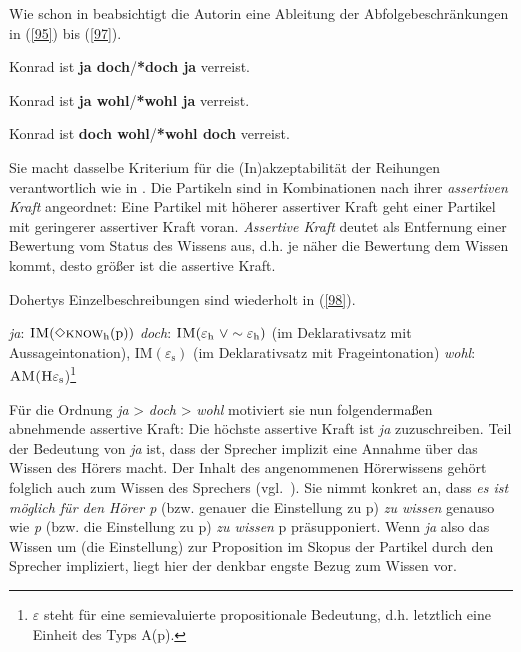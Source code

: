 Wie schon in \citet{Doherty1985} beabsichtigt die Autorin eine Ableitung der Abfolgebeschränkungen in (\ref{95}) bis (\ref{97}).

\begin{exe}
	\ex\label{95} 
	Konrad ist \textbf{ja doch}/\textbf{*doch ja} verreist.
\end{exe}
\begin{exe}
	\ex\label{96} 
	Konrad ist \textbf{ja wohl}/\textbf{*wohl ja} verreist.
\end{exe}
\begin{exe}
	\ex\label{97} 
	Konrad ist \textbf{doch wohl}/\textbf{*wohl doch }verreist.
			\hfill\hbox{\citet[114]{Doherty1987}}
\end{exe}
Sie macht dasselbe Kriterium für die (In)akzeptabilität der Reihungen verantwortlich wie in \citet{Doherty1985}. Die Partikeln sind in Kombinationen nach ihrer \textit{assertiven Kraft} angeordnet: Eine Partikel mit höherer assertiver Kraft geht einer Partikel mit geringerer assertiver Kraft voran. \textit{Assertive Kraft} deutet \citet{Doherty1987} als Entfernung einer Bewertung vom Status des Wissens aus, d.h. je näher die Bewertung dem Wissen kommt, desto größer ist die assertive Kraft.

Dohertys Einzelbeschreibungen sind wiederholt in (\ref{98}).
\begin{exe}
	\ex\label{98} 
		\begin{xlist}	
			\ex\label{98a} \textit{ja}: $\textrm{\textsc{IM}}(\Diamond \textrm{\textsc{know}}_{\textrm{h}}(\textrm{p}))$
			\ex\label{98b} \textit{doch}: $\textrm{\textsc{IM}}(\varepsilon_{\textrm{h}} \ \lor \sim\varepsilon_{\textrm{h}})$ (im Deklarativsatz mit Aussageintonation), \textsc{IM}$(\varepsilon_{\textrm{s}})$ (im Deklarativsatz mit Frageintonation)
			\ex\label{98c} \textit{wohl}: $\textrm{\textsc{AM(H}}\varepsilon_{\textrm{s}}$)\footnote{$\varepsilon$ steht für eine semievaluierte propositionale Bedeutung, d.h. 																			letztlich eine Einheit des Typs A(p).}			
		\end{xlist}
\end{exe}
Für die Ordnung \textit{ja} > \textit{doch} > \textit{wohl} motiviert sie nun folgendermaßen abnehmende assertive Kraft: Die höchste assertive Kraft ist \textit{ja} zuzuschreiben. Teil der Bedeutung von \textit{ja} ist, dass der Sprecher implizit eine Annahme über das Wissen des Hörers macht. Der Inhalt des angenommenen Hörerwissens gehört folglich auch zum Wissen des Sprechers (vgl.\ \citealt[103]{Doherty1987}). Sie nimmt konkret an, dass \textit{es ist möglich für den Hörer p} (bzw. genauer die Einstellung zu p) \textit{zu wissen} genauso wie \textit{p} (bzw. die Einstellung zu p) \textit{zu wissen} p präsupponiert. Wenn \textit{ja} also das Wissen um (die Einstellung) zur Proposition im Skopus der Partikel durch den Sprecher impliziert, liegt hier der denkbar engste Bezug zum Wissen vor. 

